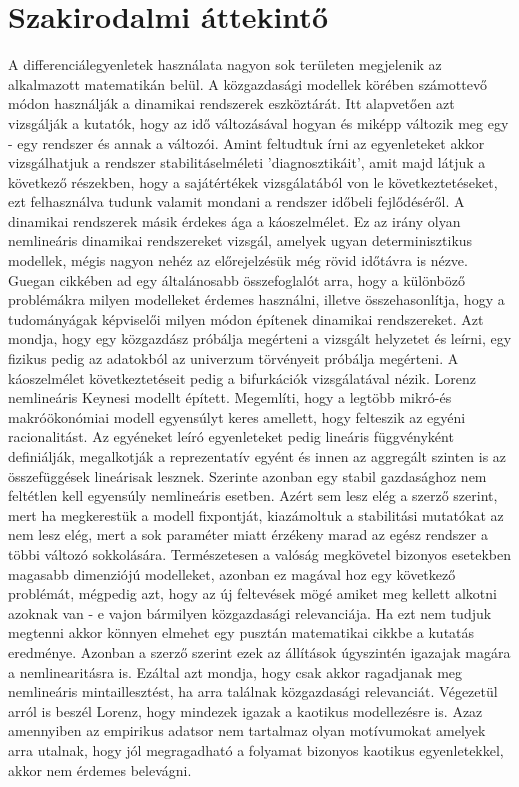 \documentclass{article}
\theoremstyle{definition}
\theoremstyle{theorem}
\begin{document}
\section{Szakirodalmi áttekintő}
A differenciálegyenletek használata nagyon sok területen megjelenik az alkalmazott matematikán belül. A közgazdasági modellek körében számottevő módon használják a dinamikai rendszerek eszköztárát. Itt alapvetően azt vizsgálják a kutatók, hogy az idő változásával hogyan és miképp változik meg egy - egy rendszer és annak a változói. Amint feltudtuk írni az egyenleteket akkor vizsgálhatjuk a rendszer stabilitáselméleti 'diagnosztikáit', amit majd látjuk a következő részekben, hogy a sajátértékek vizsgálatából von le következtetéseket, ezt felhasználva tudunk valamit mondani a rendszer  időbeli fejlődéséről.\newline
A dinamikai rendszerek másik érdekes ága a káoszelmélet. Ez az irány olyan nemlineáris dinamikai rendszereket vizsgál, amelyek ugyan determinisztikus modellek, mégis nagyon nehéz az előrejelzésük még rövid időtávra is nézve. Guegan \cite{GUEGAN200989} cikkében ad egy általánosabb összefoglalót arra, hogy a különböző problémákra milyen modelleket érdemes használni, illetve összehasonlítja, hogy a tudományágak képviselői milyen módon építenek dinamikai rendszereket.
Azt mondja, hogy egy közgazdász próbálja megérteni a vizsgált helyzetet és leírni, egy fizikus pedig az adatokból az univerzum törvényeit próbálja megérteni. A káoszelmélet következtetéseit pedig a bifurkációk vizsgálatával nézik. Lorenz \cite{Lorenz1994} nemlineáris Keynesi modellt épített. Megemlíti, hogy a legtöbb mikró-és makróökonómiai modell egyensúlyt keres amellett, hogy felteszik az egyéni racionalitást. Az egyéneket leíró egyenleteket pedig lineáris függvényként definiálják, megalkotják a reprezentatív egyént és innen az aggregált szinten is az összefüggések lineárisak lesznek. Szerinte azonban egy stabil gazdasághoz nem feltétlen kell egyensúly nemlineáris esetben. Azért sem lesz elég a szerző szerint, mert ha megkerestük a modell fixpontját, kiazámoltuk a stabilitási mutatókat az nem lesz elég, mert a sok paraméter miatt érzékeny marad az egész rendszer a többi változó sokkolására. Természetesen a valóság megkövetel bizonyos esetekben magasabb dimenziójú modelleket, azonban ez magával hoz egy következő problémát, mégpedig azt, hogy az új feltevések mögé amiket meg kellett alkotni azoknak van - e vajon bármilyen közgazdasági relevanciája. Ha ezt nem tudjuk megtenni akkor könnyen elmehet egy pusztán matematikai cikkbe a kutatás eredménye. Azonban a szerző szerint ezek az állítások úgyszintén igazajak magára a nemlinearitásra is. Ezáltal azt mondja, hogy csak akkor ragadjanak meg nemlineáris mintaillesztést, ha arra találnak közgazdasági relevanciát. Végezetül arról is beszél Lorenz, hogy mindezek igazak a kaotikus modellezésre is. Azaz amennyiben az empirikus adatsor nem tartalmaz olyan motívumokat amelyek arra utalnak, hogy jól megragadható a folyamat bizonyos kaotikus egyenletekkel, akkor nem érdemes belevágni.\newline
\end{document}
